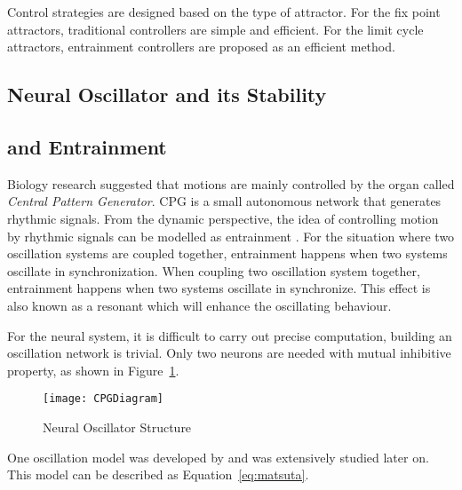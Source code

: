 Control strategies are designed based on the type of attractor.
For the fix point attractors, traditional \pd controllers are simple and efficient.
For the limit cycle attractors,  entrainment controllers are  proposed as an efficient method.


\subsection{Neural Oscillator and its Stability}


\subsection{\cpg and Entrainment}
Biology research suggested that motions are mainly controlled by the organ called \emph{Central Pattern Generator}.
CPG is a small autonomous network that generates rhythmic signals.
From the dynamic perspective, the idea of controlling motion by rhythmic signals can be modelled as entrainment \citep{Gonz'alez-Miranda2004}.
For the situation where two oscillation systems are coupled together, entrainment happens when two systems oscillate in synchronization.
When coupling two oscillation system together, entrainment happens when two systems oscillate in synchronize. 
This effect is also known as a resonant which will enhance the oscillating behaviour. 


For the neural system, it is difficult to carry out precise computation, building an oscillation network is trivial. 
Only two neurons are needed with mutual inhibitive property, as shown in Figure~\ref{fig:cpgdia}.
\begin{figure}[h]
\begin{center}
\texttt{[image: CPGDiagram]}
\caption{Neural Oscillator Structure}
\label{fig:cpgdia}
\end{center}
\end{figure}


One oscillation model was developed  by \citet{neurooscillation} and was extensively studied later on. 
This model can be described as Equation~\ref{eq:matsuta}.

